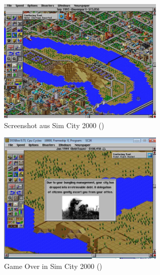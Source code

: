 \begin{figure}
    \begin{center}
        \includegraphics[width=300px]{0.bilder/simcity.jpg}
    \end{center}
    \caption{Screenshot aus Sim City 2000 (\cite{simcity:igdb})} \label{image:simcity}
\end{figure}
\begin{figure}
    \begin{center}
        \includegraphics[width=300px]{0.bilder/simcityend.jpeg}
    \end{center}
    \caption{Game Over in Sim City 2000 (\cite{simcity:gameover})} \label{image:simcitygameover}
\end{figure}
